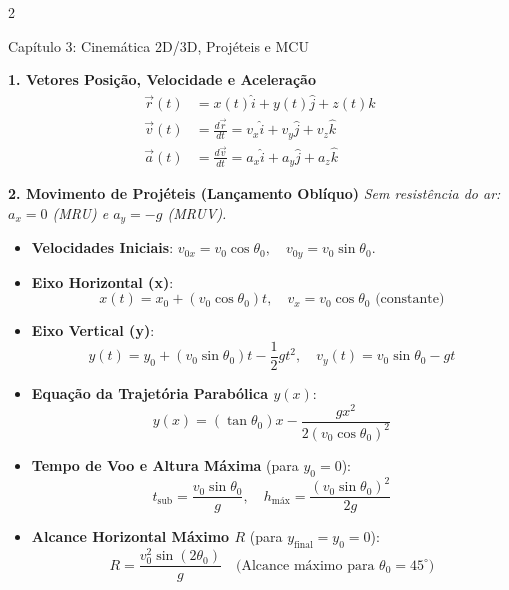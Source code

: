 \documentclass[9pt,a4paper]{article}
\begin{document}
\begin{multicols*}{2}

\begin{topicbox}{Capítulo 3: Cinemática 2D/3D, Projéteis e MCU}

\textbf{1. Vetores Posição, Velocidade e Aceleração}
\begin{align*}
    \vec{r}(t) &= x(t)\hat{i} + y(t)\hat{j} + z(t)\hat{k} \\
    \vec{v}(t) &= \frac{d\vec{r}}{dt} = v_x \hat{i} + v_y \hat{j} + v_z \hat{k} \\
    \vec{a}(t) &= \frac{d\vec{v}}{dt} = a_x \hat{i} + a_y \hat{j} + a_z \hat{k}
\end{align*}

\textbf{2. Movimento de Projéteis (Lançamento Oblíquo)}
\textit{Sem resistência do ar: $a_x = 0$ (MRU) e $a_y = -g$ (MRUV).}
\begin{itemize}[leftmargin=*,itemsep=0pt]
    \item \textbf{Velocidades Iniciais}: $v_{0x} = v_0 \cos\theta_0, \quad v_{0y} = v_0 \sin\theta_0$.
    \item \textbf{Eixo Horizontal (x)}:
    \begin{equation*}
        x(t) = x_0 + (v_0 \cos\theta_0) t, \quad v_x = v_0 \cos\theta_0 \text{ (constante)}
    \end{equation*}
    \item \textbf{Eixo Vertical (y)}:
    \begin{equation*}
        y(t) = y_0 + (v_0 \sin\theta_0) t - \frac{1}{2} g t^2, \quad v_y(t) = v_0 \sin\theta_0 - g t
    \end{equation*}
    \item \textbf{Equação da Trajetória Parabólica $y(x)$}:
    \begin{equation*}
        y(x) = (\tan\theta_0) x - \frac{g x^2}{2(v_0 \cos\theta_0)^2}
    \end{equation*}
    \item \textbf{Tempo de Voo e Altura Máxima} (para $y_0 = 0$):
    \begin{equation*}
        t_{\text{sub}} = \frac{v_0 \sin\theta_0}{g}, \quad h_{\text{máx}} = \frac{(v_0 \sin\theta_0)^2}{2g}
    \end{equation*}
    \item \textbf{Alcance Horizontal Máximo $R$} (para $y_{\text{final}} = y_0 = 0$):
    \begin{equation*}
        R = \frac{v_0^2 \sin(2\theta_0)}{g} \quad \text{(Alcance máximo para } \theta_0 = 45^\circ\text{)}
    \end{equation*}
\end{itemize}


\end{topicbox}
\end{multicols*}
\end{document}
